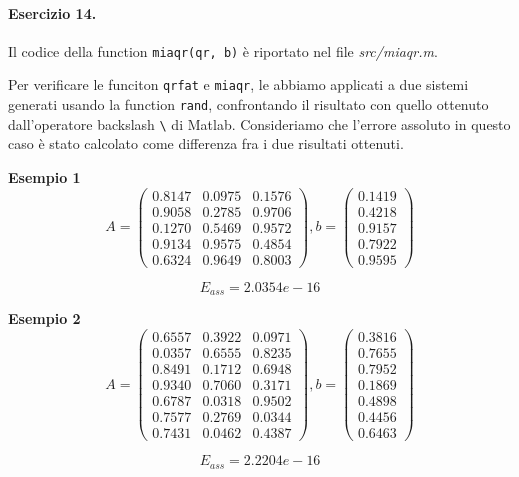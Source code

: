 \paragraph{Esercizio 14.} Il codice della function \verb|miaqr(qr, b)| è riportato nel file \emph{src/miaqr.m}.

Per verificare le funciton \verb|qrfat| e \verb|miaqr|, le abbiamo applicati a due sistemi generati usando la function \verb|rand|, confrontando il risultato con quello ottenuto dall'operatore backslash \verb|\| di Matlab. Consideriamo che l'errore assoluto in questo caso è stato calcolato come differenza fra i due risultati ottenuti.

\textbf{Esempio 1}
\[
A = \begin{pmatrix}
0.8147 & 0.0975 & 0.1576\\
0.9058 & 0.2785 & 0.9706\\
0.1270 & 0.5469 & 0.9572\\
0.9134 & 0.9575 & 0.4854\\
0.6324 & 0.9649 & 0.8003
\end{pmatrix}, b = \begin{pmatrix}
0.1419\\
0.4218\\
0.9157\\
0.7922\\
0.9595
\end{pmatrix}
\]

\[
E_{ass} = 2.0354e-16
\]

\textbf{Esempio 2}
\[
A = \begin{pmatrix}
0.6557 & 0.3922 & 0.0971\\
0.0357 & 0.6555 & 0.8235\\
0.8491 & 0.1712 & 0.6948\\
0.9340 & 0.7060 & 0.3171\\
0.6787 & 0.0318 & 0.9502\\
0.7577 & 0.2769 & 0.0344\\
0.7431 & 0.0462 & 0.4387
\end{pmatrix}, b = \begin{pmatrix}
0.3816\\
0.7655\\
0.7952\\
0.1869\\
0.4898\\
0.4456\\
0.6463
\end{pmatrix}
\]

\[
E_{ass} = 2.2204e-16
\]